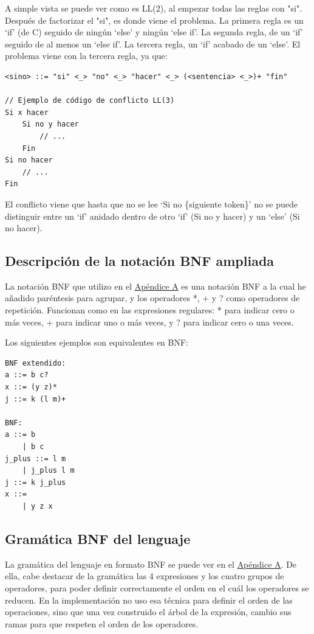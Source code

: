 \documentclass{report}
\begin{document}
	A simple vista se puede ver como es LL(2), al empezar todas las reglas con "si". Después de factorizar el "si", es donde viene el problema. La primera regla es un `if' (de C) seguido de ningún `else' y ningún `else if'. La segunda regla, de un `if' seguido de al menos un `else if'. La tercera regla, un `if' acabado de un `else'. El problema viene con la tercera regla, ya que:
	
	\vspace{10px}
	
	\begin{BVerbatim}
<sino> ::= "si" <_> "no" <_> "hacer" <_> (<sentencia> <_>)+ "fin"

// Ejemplo de código de conflicto LL(3)
Si x hacer
	Si no y hacer
		// ...
	Fin
Si no hacer
	// ...
Fin
	\end{BVerbatim}
	
	\vspace{10px}
	
	El conflicto\cite{conflictoll3} viene que hasta que no se lee `Si no \{siguiente token\}' no se puede distinguir entre un `if' anidado dentro de otro `if' (Si no y hacer) y un `else' (Si no hacer).
	
	\subsection{Descripción de la notación BNF ampliada}
	
	La notación BNF que utilizo en el \hyperref[app:a]{Apéndice A} es una notación BNF a la cual he añadido paréntesis para agrupar, y los operadores *, + y ? como operadores de repetición. Funcionan como en las expresiones regulares: * para indicar cero o más veces, + para indicar uno o más veces, y ? para indicar cero o una veces. 
	
	Los siguientes ejemplos son equivalentes en BNF:
	
	\begin{BVerbatim}
BNF extendido:
a ::= b c?
x ::= (y z)*
j ::= k (l m)+

BNF:
a ::= b
    | b c
j_plus ::= l m
    | j_plus l m	
j ::= k j_plus
x ::= 
    | y z x
	\end{BVerbatim}
	
	\subsection{Gramática BNF del lenguaje}
	La gramática del lenguaje en formato BNF se puede ver en el \hyperref[app:a]{Apéndice A}. De ella, cabe destacar de la gramática las 4 expresiones y los cuatro grupos de operadores, para poder definir correctamente el orden en el cuál los operadores se reducen. En la implementación no uso esa técnica para definir el orden de las operaciones, sino que una vez construido el árbol de la expresión, cambio sus ramas para que respeten el orden de los operadores. 
		
\end{document}
